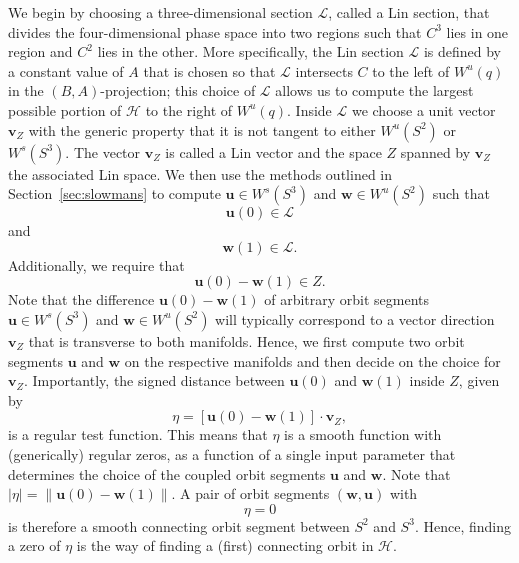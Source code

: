 \documentclass{ws-ijbc}
\begin{document}
We begin by choosing a three-dimensional section $\mathscr{L}$, called a Lin section, that divides the four-dimensional phase space into two regions such that $C^3$ lies in one region and $C^2$ lies in the other.  More specifically, the Lin section $\mathscr{L}$ is defined by a constant value of $A$ that is chosen so that $\mathscr{L}$ intersects $C$ to the left of $W^u(q)$ in the $(B,A)$-projection; this choice of $\mathscr{L}$ allows us to compute the largest possible portion of $\mathscr{H}$ to the right of $W^u(q)$.  Inside $\mathscr{L}$ we choose a unit vector $\mathbf{v}_Z$ with the generic property that it is not tangent to either $W^u(S^2)$ or $W^s(S^3)$.  The vector $\mathbf{v}_Z$ is called a Lin vector and the space $Z$ spanned by $\mathbf{v}_Z$ the associated Lin space.  We then use the methods outlined in Section~\ref{sec:slowmans} to compute $\mathbf{u} \in W^s(S^3)$ and $\mathbf{w} \in W^u(S^2)$ such that
%
\begin{equation}
	\mathbf{u}(0) \in \mathscr{L}
	\label{general_conditions_heteroclinic_1}
\end{equation}
%
and
%
\begin{equation}	
	 \mathbf{w}(1) \in \mathscr{L}.
	 \label{general_conditions_heteroclinic_2}
\end{equation}
%
Additionally, we require that
%
\begin{equation*}
	\mathbf{u}(0)-\mathbf{w}(1) \in Z.
\end{equation*}
%
Note that the difference $\mathbf{u}(0)-\mathbf{w}(1)$ of arbitrary orbit segments $\mathbf{u} \in W^s(S^3)$ and $\mathbf{w} \in W^u(S^2)$ will typically correspond to a vector direction $\mathbf{v}_Z$ that is transverse to both manifolds.  Hence, we first compute two orbit segments $\mathbf{u}$ and $\mathbf{w}$ on the respective manifolds and then decide on the choice for $\mathbf{v}_Z$.  Importantly, the signed distance between $\mathbf{u}(0)$ and $\mathbf{w}(1)$ inside $Z$, given by
%
\begin{equation}
	\eta=[\mathbf{u}(0)-\mathbf{w}(1)] \cdot \mathbf{v}_Z,
	\label{general_conditions_heteroclinic_3}
\end{equation}
%
is a regular test function.  This means that $\eta$ is a smooth function with (generically) regular zeros, as a function of a single input parameter that determines the choice of the coupled orbit segments $\mathbf{u}$ and $\mathbf{w}$. Note that $\left\lvert \eta \right\lvert = \left\lVert \mathbf{u}(0)-\mathbf{w}(1) \right\lVert$. A pair of orbit segments $(\mathbf{w},\mathbf{u})$ with 
%
\begin{equation}
	\eta = 0
	\label{general_conditions_heteroclinic_4}
\end{equation}
%
is therefore a smooth connecting orbit segment between $S^2$ and $S^3$.  Hence, finding a zero of $\eta$ is the way of finding a (first) connecting orbit in $\mathscr{H}$.
\end{document}
